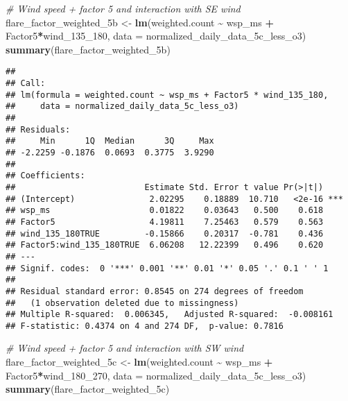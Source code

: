 \documentclass[
]{article}
\newenvironment{Shaded}{\begin{snugshade}}{\end{snugshade}}
\newcommand{\AttributeTok}[1]{\textcolor[rgb]{0.13,0.29,0.53}{#1}}
\newcommand{\CommentTok}[1]{\textcolor[rgb]{0.56,0.35,0.01}{\textit{#1}}}
\newcommand{\FunctionTok}[1]{\textcolor[rgb]{0.13,0.29,0.53}{\textbf{#1}}}
\newcommand{\NormalTok}[1]{#1}
\newcommand{\OtherTok}[1]{\textcolor[rgb]{0.56,0.35,0.01}{#1}}
\newcommand{\SpecialCharTok}[1]{\textcolor[rgb]{0.81,0.36,0.00}{\textbf{#1}}}
\begin{document}
\begin{Shaded}
\begin{Highlighting}[]
\CommentTok{\# Wind speed + factor 5 and interaction with SE wind}
\NormalTok{flare\_factor\_weighted\_5b }\OtherTok{\textless{}{-}} \FunctionTok{lm}\NormalTok{(weighted.count }\SpecialCharTok{\textasciitilde{}}\NormalTok{ wsp\_ms }\SpecialCharTok{+}\NormalTok{ Factor5}\SpecialCharTok{*}\NormalTok{wind\_135\_180, }
                               \AttributeTok{data =}\NormalTok{ normalized\_daily\_data\_5c\_less\_o3)}
\FunctionTok{summary}\NormalTok{(flare\_factor\_weighted\_5b)}
\end{Highlighting}
\end{Shaded}

\begin{verbatim}
## 
## Call:
## lm(formula = weighted.count ~ wsp_ms + Factor5 * wind_135_180, 
##     data = normalized_daily_data_5c_less_o3)
## 
## Residuals:
##     Min      1Q  Median      3Q     Max 
## -2.2259 -0.1876  0.0693  0.3775  3.9290 
## 
## Coefficients:
##                          Estimate Std. Error t value Pr(>|t|)    
## (Intercept)               2.02295    0.18889  10.710   <2e-16 ***
## wsp_ms                    0.01822    0.03643   0.500    0.618    
## Factor5                   4.19811    7.25463   0.579    0.563    
## wind_135_180TRUE         -0.15866    0.20317  -0.781    0.436    
## Factor5:wind_135_180TRUE  6.06208   12.22399   0.496    0.620    
## ---
## Signif. codes:  0 '***' 0.001 '**' 0.01 '*' 0.05 '.' 0.1 ' ' 1
## 
## Residual standard error: 0.8545 on 274 degrees of freedom
##   (1 observation deleted due to missingness)
## Multiple R-squared:  0.006345,   Adjusted R-squared:  -0.008161 
## F-statistic: 0.4374 on 4 and 274 DF,  p-value: 0.7816
\end{verbatim}

\begin{Shaded}
\begin{Highlighting}[]
\CommentTok{\# Wind speed + factor 5 and interaction with SW wind}
\NormalTok{flare\_factor\_weighted\_5c }\OtherTok{\textless{}{-}} \FunctionTok{lm}\NormalTok{(weighted.count }\SpecialCharTok{\textasciitilde{}}\NormalTok{ wsp\_ms }\SpecialCharTok{+}\NormalTok{ Factor5}\SpecialCharTok{*}\NormalTok{wind\_180\_270, }
                               \AttributeTok{data =}\NormalTok{ normalized\_daily\_data\_5c\_less\_o3)}
\FunctionTok{summary}\NormalTok{(flare\_factor\_weighted\_5c)}
\end{Highlighting}
\end{Shaded}
\end{document}
